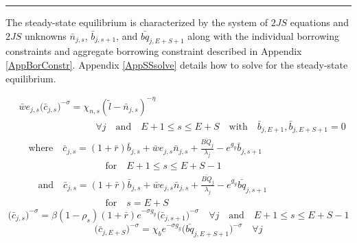 \documentclass[letterpaper,12pt]{article}
\theoremstyle{definition}
\begin{document}
    \hrule
    \begin{spacing}{1.5}
    \vspace{10mm}

    The steady-state equilibrium is characterized by the system of $2JS$ equations and $2JS$ unknowns $\bar{n}_{j,s}$, $\bar{b}_{j,s+1}$, and $\bar{bq}_{j,E+S+1}$ along with the individual borrowing constraints and aggregate borrowing constraint described in Appendix \ref{AppBorConstr}. Appendix \ref{AppSSsolve} details how to solve for the steady-state equilibrium.

    \begin{equation}\label{EqEulerLabSS}
      \begin{split}
        &\bar{w}e_{j,s}\bigl(\bar{c}_{j,s}\bigr)^{-\sigma} = \chi_{n,s}(\tilde{l} - \bar{n}_{j,s})^{-\eta} \\
        &\quad\quad\quad\quad\quad\quad\quad\quad\forall j \quad\text{and}\quad E+1\leq s\leq E+S \quad\text{with}\quad \bar{b}_{j,E+1},\bar{b}_{j,E+S+1}=0 \\
        &\quad\text{where}\quad \bar{c}_{j,s} = \left(1+\bar{r}\right)\bar{b}_{j,s} + \bar{w}e_{j,s}\bar{n}_{j,s} + \frac{\bar{BQ}_{j}}{\lambda_j} - e^{g_y}\bar{b}_{j,s+1} \\
        &\quad\quad\quad\quad\quad\quad\quad\quad\quad\text{for}\quad E+1\leq s\leq E+S-1 \\
        &\quad\quad\text{and}\quad \bar{c}_{j,s} = \left(1+\bar{r}\right)\bar{b}_{j,s} + \bar{w}e_{j,s}\bar{n}_{j,s} + \frac{\bar{BQ}_{j}}{\lambda_j} - e^{g_y}\bar{bq}_{j,s+1} \\
        &\quad\quad\quad\quad\quad\quad\quad\quad\quad\text{for}\quad s=E+S
      \end{split}
    \end{equation}
    \begin{equation}\label{EqEulerSavSS}
      \bigl(\bar{c}_{j,s}\bigr)^{-\sigma} = \beta(1-\rho_s)(1+\bar{r})e^{-\sigma g_y}\bigl(\bar{c}_{j,s+1}\bigr)^{-\sigma}\quad\forall j \quad\text{and}\quad E+1\leq s\leq E+S-1
    \end{equation}
    \begin{equation}\label{EqEulerBeqSS}
      \bigl(\bar{c}_{j,E+S}\bigr)^{-\sigma} = \chi_b e^{-\sigma g_y}\bigl(\bar{bq}_{j,E+S+1}\bigr)^{-\sigma} \quad\forall j
    \end{equation}


\end{spacing}
\end{document}
